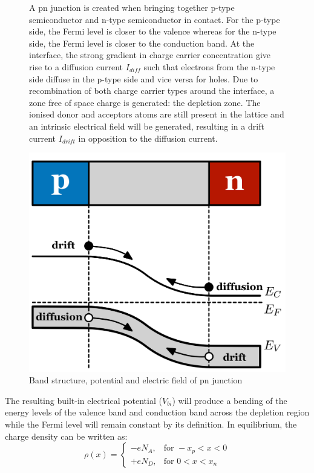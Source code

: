 		\begin{figure}[h]
		\begin{minipage}{0.53\linewidth}
			A pn junction is created when bringing together p-type semiconductor and n-type semiconductor in contact. For the p-type side, the Fermi level is closer to the valence whereas for the n-type side, the Fermi level is closer to the conduction band. At the interface, the strong gradient in charge carrier concentration give rise to a diffusion current $I_{diff}$ such that electrons from the n-type side diffuse in the p-type side and vice versa for holes. Due to recombination of both charge carrier types around the interface, a zone free of space charge is generated: the depletion zone. The ionised donor and acceptors atoms are still present in the lattice and an intrinsic electrical field will be generated, resulting in a drift current $I_{drift}$ in opposition to the diffusion current. 	
		\end{minipage}\hfill
		\begin{minipage}{0.45\linewidth}
			\centering
			\includegraphics[width=1.0\linewidth]{files/band_structure}
			\caption{Band structure, potential and electric field of pn junction }
			\label{ }
		\end{minipage}
		\end{figure}
		
		The resulting built-in electrical potential ($V_{bi}$) will produce a bending of the energy levels of the valence band and conduction band across the depletion region while the Fermi level will remain constant by its definition. 
		In equilibrium, the charge density can be written as: 
		\begin{equation}
			\rho(x) = 
			\begin{cases}
				-eN_A, & \text{for } -x_p < x < 0 \\
				+eN_D, & \text{for } 0 < x < x_n
			\end{cases}
		\end{equation}

